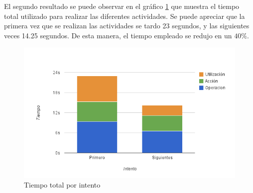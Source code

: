 El segundo resultado se puede observar en el gráfico \ref{fig:interfaz_tiempo_total_actividades} que muestra el tiempo total utilizado para realizar las diferentes actividades. Se puede apreciar que la primera vez que se realizan las actividades se tardo 23 segundos, y las siguientes veces 14.25 segundos. De esta manera, el tiempo empleado se redujo en un $40\%$.
 
\begin{figure}[ht!]
\centering
\includegraphics[scale=0.8]{resultados/imagenes/interfaz_tiempo_total_actividades.png}
\caption{Tiempo total por intento}
\label{fig:interfaz_tiempo_total_actividades}
\end{figure}